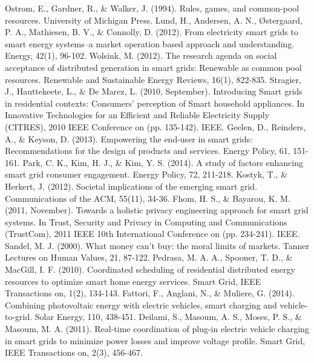 \documentclass[a4paper]{article}
\begin{document}
\begin{thebibliography}{9}

	Ostrom, E., Gardner, R., \& Walker, J. (1994). Rules, games, and common-pool resources. University of Michigan Press.
	Lund, H., Andersen, A. N., Østergaard, P. A., Mathiesen, B. V., \& Connolly, D. (2012). 
	From electricity smart grids to smart energy systems–a market operation based approach and understanding. Energy, 42(1), 96-102.
Wolsink, M. (2012). The research agenda on social acceptance of distributed generation in smart grids: Renewable as common pool 
resources. Renewable and Sustainable Energy Reviews, 16(1), 822-835.
Stragier, J., Hauttekeete, L., \& De Marez, L. (2010, September). Introducing Smart grids in residential contexts: Consumers' perception of Smart household appliances. In Innovative Technologies for an Efficient and Reliable Electricity Supply (CITRES), 2010 IEEE Conference on (pp. 135-142). IEEE.
Geelen, D., Reinders, A., \& Keyson, D. (2013). Empowering the end-user in smart grids: Recommendations for the design of products and services. Energy Policy, 61, 151-161.
 Park, C. K., Kim, H. J., \& Kim, Y. S. (2014). A study of factors enhancing smart grid consumer engagement. Energy Policy, 72, 211-218.
Kostyk, T., \& Herkert, J. (2012). Societal implications of the emerging smart grid. Communications of the ACM, 55(11), 34-36.
Fhom, H. S., \& Bayarou, K. M. (2011, November). Towards a holistic privacy engineering approach for smart grid systems. In Trust, Security and Privacy in Computing and Communications (TrustCom), 2011 IEEE 10th International Conference on (pp. 234-241). IEEE.
Sandel, M. J. (2000). What money can't buy: the moral limits of markets. Tanner Lectures on Human Values, 21, 87-122.
Pedrasa, M. A. A., Spooner, T. D., \& MacGill, I. F. (2010). Coordinated scheduling of residential distributed energy resources to optimize smart home energy services. 
Smart Grid, IEEE Transactions on, 1(2), 134-143.
Fattori, F., Anglani, N., \& Muliere, G. (2014). Combining photovoltaic energy with electric vehicles, smart charging and vehicle-to-grid. Solar Energy, 110, 438-451.
Deilami, S., Masoum, A. S., Moses, P. S., \& Masoum, M. A. (2011). Real-time coordination of plug-in electric vehicle charging in smart grids to minimize power losses and 
improve voltage profile. Smart Grid, IEEE Transactions on, 2(3), 456-467.

\end{thebibliography}
\end{document}

